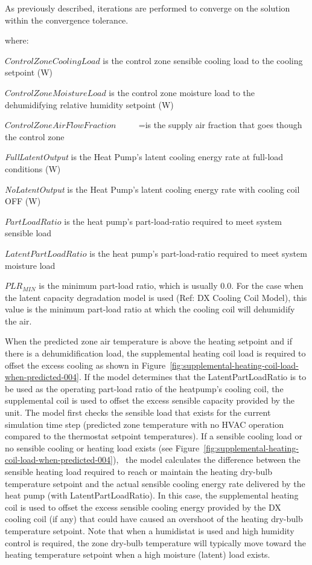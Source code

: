 As previously described, iterations are performed to converge on the solution within the convergence tolerance.

where:

\(ControlZoneCoolingLoad\) is the control zone sensible cooling load to the cooling setpoint (W)

\(ControlZoneMoistureLoad\) is the control zone moisture load to the dehumidifying relative humidity setpoint (W)

\(ControlZoneAirFlowFraction\) ~~~~ =is  the supply air fraction that goes though the control zone

\emph{FullLatentOutput} is the Heat Pump's latent cooling energy rate at full-load conditions (W)

\emph{NoLatentOutput} is the Heat Pump's latent cooling energy rate with cooling coil OFF (W)

\(PartLoadRatio\) is the heat pump's part-load-ratio required to meet system sensible load

\(LatentPartLoadRatio\) is the heat pump's part-load-ratio required to meet system moisture load

\(PL{R_{MIN}}\) is the minimum part-load ratio, which is usually 0.0. For the case when the latent capacity degradation model is used (Ref: DX Cooling Coil Model), this value is the minimum part-load ratio at which the cooling coil will dehumidify the air.

When the predicted zone air temperature is above the heating setpoint and if there is a dehumidification load, the supplemental heating coil load is required to offset the excess cooling as shown in Figure~\ref{fig:supplemental-heating-coil-load-when-predicted-004}. If the model determines that the LatentPartLoadRatio is to be used as the operating part-load ratio of the heatpump's cooling coil, the supplemental coil is used to offset the excess sensible capacity provided by the unit. The model first checks the sensible load that exists for the current simulation time step (predicted zone temperature with no HVAC operation compared to the thermostat setpoint temperatures). If a sensible cooling load or no sensible cooling or heating load exists (see Figure~\ref{fig:supplemental-heating-coil-load-when-predicted-004}),~ the model calculates the difference between the sensible heating load required to reach or maintain the heating dry-bulb temperature setpoint and the actual sensible cooling energy rate delivered by the heat pump (with LatentPartLoadRatio). In this case, the supplemental heating coil is used to offset the excess sensible cooling energy provided by the DX cooling coil (if any) that could have caused an overshoot of the heating dry-bulb temperature setpoint. Note that when a humidistat is used and high humidity control is required, the zone dry-bulb temperature will typically move toward the heating temperature setpoint when a high moisture (latent) load exists.

